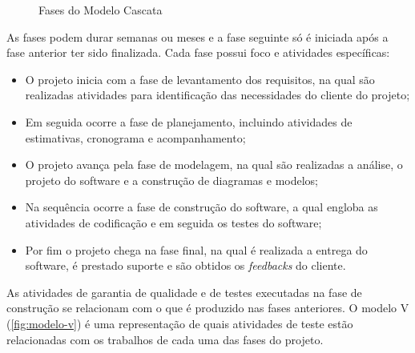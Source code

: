     \begin{figure}[!htb]
	    \centering
	    \begin{minipage}{\wd0}
		    \caption{Fases do Modelo Cascata}
		    \label{fig:modelo-cascata}
	    \end{minipage}
    \end{figure}
    
    As fases podem  durar semanas ou meses e a fase seguinte só é iniciada após a fase anterior ter sido finalizada. Cada fase possui foco e atividades específicas:
        \begin{itemize}
            \item O projeto inicia com a fase de levantamento dos requisitos, na qual são realizadas atividades para identificação das necessidades do cliente do projeto;
            \item Em seguida ocorre a fase de planejamento, incluindo atividades de estimativas, cronograma e acompanhamento;
            \item O projeto avança pela fase de modelagem, na qual são realizadas a análise, o projeto do software e a construção de diagramas e modelos;
            \item Na sequência ocorre a fase de construção do software, a qual engloba as atividades de codificação e em seguida os testes do software;
            \item Por fim o projeto chega na fase final, na qual é realizada a entrega do software, é prestado suporte e são obtidos os \emph{feedbacks} do cliente.
            
        \end{itemize}
        
    As atividades de garantia de qualidade e de testes executadas na fase de construção se relacionam com o que é produzido nas fases anteriores. O modelo V (\autoref{fig:modelo-v})  é uma representação de quais atividades de teste estão relacionadas com os trabalhos de cada uma das fases do projeto. \cite{Pressman2015}
    
